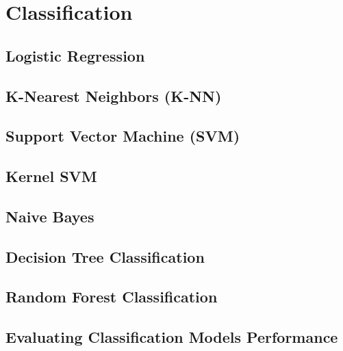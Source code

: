 \chapter{Classification}
\section{Logistic Regression}
\section{K-Nearest Neighbors (K-NN)}
\section{Support Vector Machine (SVM)}
\section{Kernel SVM}
\section{Naive Bayes}
\section{Decision Tree Classification}
\section{Random Forest Classification}
\section{Evaluating Classification Models Performance}